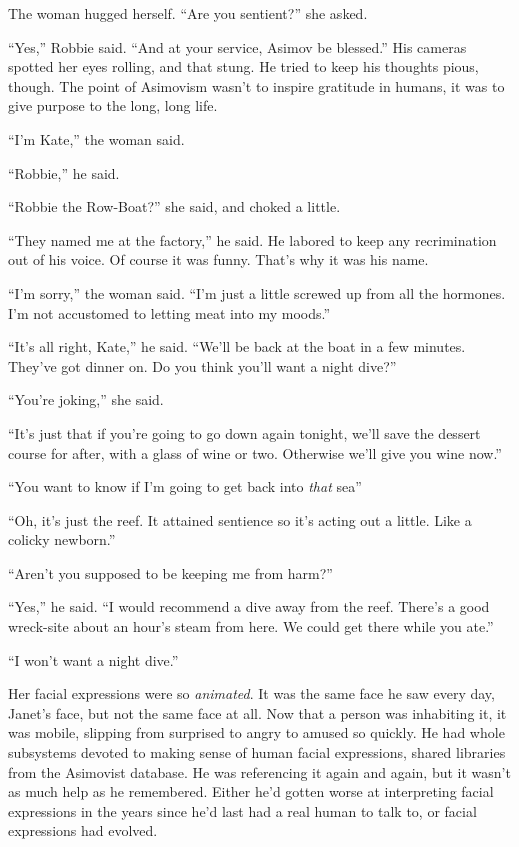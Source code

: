 The woman hugged herself. “Are you sentient?” she asked.

“Yes,” Robbie said. “And at your service, Asimov be blessed.” His
cameras spotted her eyes rolling, and that stung. He tried to keep
his thoughts pious, though. The point of Asimovism wasn’t to
inspire gratitude in humans, it was to give purpose to the long,
long life.

“I’m Kate,” the woman said.

“Robbie,” he said.

“Robbie the Row-Boat?” she said, and choked a little.

“They named me at the factory,” he said. He labored to keep any
recrimination out of his voice. Of course it was funny. That’s why
it was his name.

“I’m sorry,” the woman said. “I’m just a little screwed up from all
the hormones. I’m not accustomed to letting meat into my moods.”

“It’s all right, Kate,” he said. “We’ll be back at the boat in a
few minutes. They’ve got dinner on. Do you think you’ll want a
night dive?”

“You’re joking,” she said.

“It’s just that if you’re going to go down again tonight, we’ll
save the dessert course for after, with a glass of wine or two.
Otherwise we’ll give you wine now.”

“You want to know if I’m going to get back into \emph{that} sea\dash{}”

“Oh, it’s just the reef. It attained sentience so it’s acting out a
little. Like a colicky newborn.”

“Aren’t you supposed to be keeping me from harm?”

“Yes,” he said. “I would recommend a dive away from the reef.
There’s a good wreck-site about an hour’s steam from here. We could
get there while you ate.”

“I won’t want a night dive.”

Her facial expressions were so \emph{animated}. It was the same
face he saw every day, Janet’s face, but not the same face at all.
Now that a person was inhabiting it, it was mobile, slipping from
surprised to angry to amused so quickly. He had whole subsystems
devoted to making sense of human facial expressions, shared
libraries from the Asimovist database. He was referencing it again
and again, but it wasn’t as much help as he remembered. Either he’d
gotten worse at interpreting facial expressions in the years since
he’d last had a real human to talk to, or facial expressions had
evolved.

